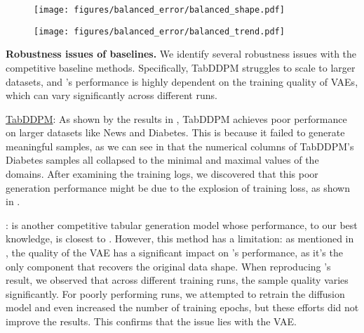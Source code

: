\begin{rebuttal}
\begin{figure}[t]
\begin{minipage}[h]{0.60\textwidth}
\begin{threeparttable}
{    \label{tbl:exp-balanced_error}
    }
    \end{threeparttable}
\end{minipage}
\hspace{0.01\textwidth}
\begin{minipage}[h]{0.39\textwidth} \centering
    \texttt{[image: figures/balanced\_error/balanced\_shape.pdf]}
    \vspace{-20pt} 
    \label{fig:balanced_error_shape}
\end{minipage}
\begin{minipage}[h]{\textwidth} \centering
    \vspace{5pt}
    \texttt{[image: figures/balanced\_error/balanced\_trend.pdf]}
    \vspace{-5pt}
    \label{fig:balanced_error_trend}
\end{minipage}
\end{figure}
 
\textbf{Robustness issues of baselines.} We identify several robustness issues with the competitive baseline methods. Specifically, TabDDPM struggles to scale to larger datasets, and \tabsyn’s performance is highly dependent on the training quality of VAEs, which can vary significantly across different runs.

\underline{TabDDPM}: As shown by the results in , TabDDPM achieves poor performance on larger datasets like News and Diabetes. This is because it failed to generate meaningful samples, as we can see in  that the numerical columns of TabDDPM's Diabetes samples all collapsed to the minimal and maximal values of the domains. After examining the training logs, we discovered that this poor generation performance might be due to the explosion of training loss, as shown in .

\underline{\tabsyn}: \tabsyn is another competitive tabular generation model whose performance, to our best knowledge, is closest to \method. However, this method has a limitation: as mentioned in \citet{zhang2024mixedtype}, the quality of the VAE has a significant impact on \tabsyn’s performance, as it's the only component that recovers the original data shape. When reproducing \tabsyn's result, we observed that across different training runs, the sample quality varies significantly. For poorly performing runs, we attempted to retrain the diffusion model and even increased the number of training epochs, but these efforts did not improve the results. This confirms that the issue lies with the VAE.


\end{rebuttal}

